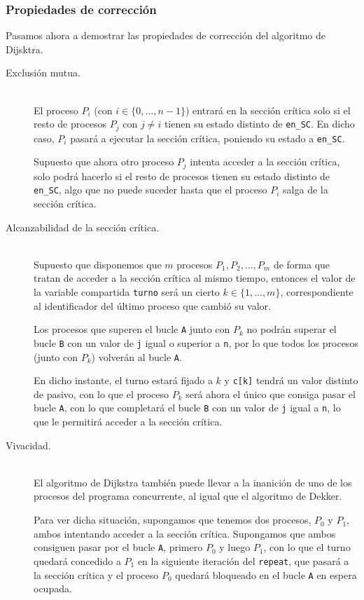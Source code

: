 \subsubsection{Propiedades de corrección}
Pasamos ahora a demostrar las propiedades de corrección del algoritmo de Dijsktra.

\begin{description}
    \item [Exclusión mutua.]~\\
        El proceso $P_i$ (con $i \in \{0,\ldots,n-1\}$) entrará en la sección crítica solo si el resto de procesos $P_j$ con $j\neq i$ tienen su estado distinto de \verb|en_SC|. En dicho caso, $P_i$ pasará a ejecutar la sección crítica, poniendo su estado a \verb|en_SC|. 

        Supuesto que ahora otro proceso $P_j$ intenta acceder a la sección crítica, solo podrá hacerlo si el resto de procesos tienen su estado distinto de \verb|en_SC|, algo que no puede suceder hasta que el proceso $P_i$ salga de la sección crítica.
    \item [Alcanzabilidad de la sección crítica.]~\\
        Supuesto que disponemos que $m$ procesos $P_1, P_2, \ldots, P_m$ de forma que tratan de acceder a la sección crítica al mismo tiempo, entonces el valor de la variable compartida \verb|turno| será un cierto $k \in \{1,\ldots,m\}$, correspondiente al identificador del último proceso que cambió su valor. 

        Los procesos que superen el bucle \verb|A| junto con $P_k$ no podrán superar el bucle \verb|B| con un valor de \verb|j| igual o superior a \verb|n|, por lo que todos los procesos (junto con $P_k$) volverán al bucle \verb|A|.

        En dicho instante, el turno estará fijado a $k$ y \verb|c[k]| tendrá un valor distinto de pasivo, con lo que el proceso $P_k$ será ahora el único que consiga pasar el bucle \verb|A|, con lo que completará el bucle \verb|B| con un valor de \verb|j| igual a \verb|n|, lo que le permitirá acceder a la sección crítica.

    \item [Vivacidad.]~\\
        El algoritmo de Dijkstra también puede llevar a la inanición de uno de los procesos del programa concurrente, al igual que el algoritmo de Dekker.

        Para ver dicha situación, supongamos que tenemos dos procesos, $P_0$ y $P_1$, ambos intentando acceder a la sección crítica. Supongamos que ambos consiguen pasar por el bucle \verb|A|, primero $P_0$ y luego $P_1$, con lo que el turno quedará concedido a $P_1$ en la siguiente iteración del \verb|repeat|, que pasará a la sección crítica y el proceso $P_0$ quedará bloqueado en el bucle \verb|A| en espera ocupada.


\end{description}

